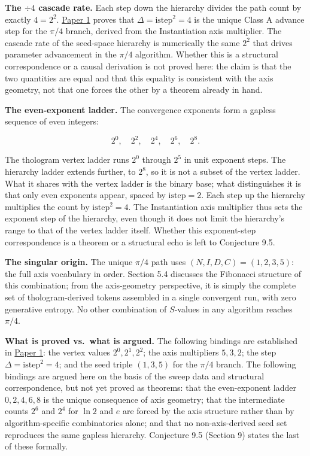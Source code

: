 \documentclass[
  11pt,
  letterpaper,
]{article}
\begin{document}
\textbf{The \(\div 4\) cascade rate.} Each step down the hierarchy
divides the path count by exactly \(4 = 2^2\).
\href{https://github.com/baardev/truevalue/blob/main/docnav/Research/papers/1_recursive-tholonic-five-constants/1_recursive-tholonic-five-constants.pdf}{Paper
1} proves that \(\Delta = \mathrm{istep}^2 = 4\) is the unique Class A
advance step for the \(\pi/4\) branch, derived from the Instantiation
axis multiplier. The cascade rate of the seed-space hierarchy is
numerically the same \(2^2\) that drives parameter advancement in the
\(\pi/4\) algorithm. Whether this is a structural correspondence or a
causal derivation is not proved here: the claim is that the two
quantities are equal and that this equality is consistent with the axis
geometry, not that one forces the other by a theorem already in hand.

\textbf{The even-exponent ladder.} The convergence exponents form a
gapless sequence of even integers:

\[2^0, \quad 2^2, \quad 2^4, \quad 2^6, \quad 2^8.\]

The thologram vertex ladder runs \(2^0\) through \(2^5\) in unit
exponent steps. The hierarchy ladder extends further, to \(2^8\), so it
is not a subset of the vertex ladder. What it shares with the vertex
ladder is the binary base; what distinguishes it is that only even
exponents appear, spaced by \(\mathrm{istep} = 2\). Each step up the
hierarchy multiplies the count by \(\mathrm{istep}^2 = 4\). The
Instantiation axis multiplier thus sets the exponent step of the
hierarchy, even though it does not limit the hierarchy's range to that
of the vertex ladder itself. Whether this exponent-step correspondence
is a theorem or a structural echo is left to Conjecture 9.5.

\textbf{The singular origin.} The unique \(\pi/4\) path uses
\((N, I, D, C) = (1, 2, 3, 5)\): the full axis vocabulary in order.
Section 5.4 discusses the Fibonacci structure of this combination; from
the axis-geometry perspective, it is simply the complete set of
thologram-derived tokens assembled in a single convergent run, with zero
generative entropy. No other combination of \(S\)-values in any
algorithm reaches \(\pi/4\).

\textbf{What is proved vs.~what is argued.} The following bindings are
established in
\href{https://github.com/baardev/truevalue/blob/main/docnav/Research/papers/1_recursive-tholonic-five-constants/1_recursive-tholonic-five-constants.pdf}{Paper
1}: the vertex values \(2^0, 2^1, 2^2\); the axis multipliers
\(5, 3, 2\); the step \(\Delta = \mathrm{istep}^2 = 4\); and the seed
triple \((1, 3, 5)\) for the \(\pi/4\) branch. The following bindings
are argued here on the basis of the sweep data and structural
correspondence, but not yet proved as theorems: that the even-exponent
ladder \(0, 2, 4, 6, 8\) is the unique consequence of axis geometry;
that the intermediate counts \(2^6\) and \(2^4\) for \(\ln 2\) and \(e\)
are forced by the axis structure rather than by algorithm-specific
combinatorics alone; and that no non-axis-derived seed set reproduces
the same gapless hierarchy. Conjecture 9.5 (Section 9) states the last
of these formally.
\end{document}
